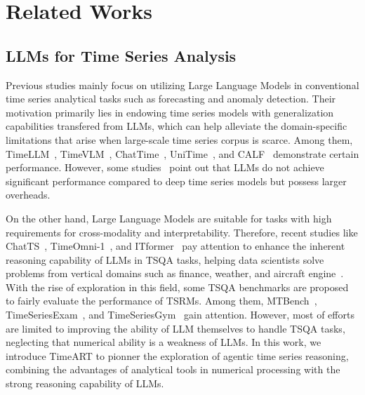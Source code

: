 \section{Related Works}
\subsection{LLMs for Time Series Analysis}
Previous studies mainly focus on utilizing Large Language Models in conventional time series analytical tasks such as forecasting and anomaly detection. Their motivation primarily lies in endowing time series models with generalization capabilities transfered from LLMs, which can help alleviate the domain-specific limitations that arise when large-scale time series corpus is scarce. Among them, TimeLLM~\citep{timellm}, TimeVLM~\citep{timevlm}, ChatTime~\citep{wang2025chattime}, UniTime~\citep{liu2024unitime}, and CALF~\citep{liu2025calf} demonstrate certain performance. However, some studies~\citep{zhou2024can,tan2024language} point out that LLMs do not achieve significant performance compared to deep time series models but possess larger overheads. 

On the other hand, Large Language Models are suitable for tasks with high requirements for cross-modality and interpretability. Therefore, recent studies like ChatTS~\citep{xie2024chatts}, TimeOmni-1~\citep{guan2025timeomni1incentivizingcomplexreasoning}, and ITformer~\citep{leiitformer} pay attention to enhance the inherent reasoning capability of LLMs in TSQA tasks, helping data scientists solve problems from vertical domains such as finance, weather, and aircraft engine~\citep{leiitformer}. With the rise of exploration in this field, some TSQA benchmarks are proposed to fairly evaluate the performance of TSRMs. Among them, MTBench~\citep{chen2025mtbench}, TimeSeriesExam~\citep{cai2024timeseriesexam}, and TimeSeriesGym~\citep{cai2025timeseriesgym} gain attention. However, most of efforts are limited to improving the ability of LLM themselves to handle TSQA tasks, neglecting that numerical ability is a weakness of LLMs. In this work, we introduce TimeART to pionner the exploration of agentic time series reasoning, combining the advantages of analytical tools in numerical processing with the strong reasoning capability of LLMs. 

